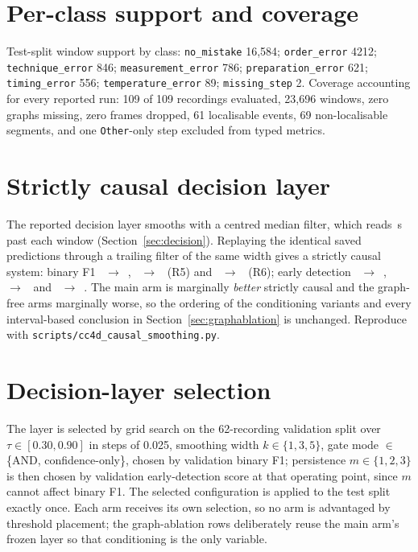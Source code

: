 \documentclass[10pt,twocolumn]{article}
\begin{document}
\section{Per-class support and coverage}
\label{app:coverage}

Test-split window support by class: \texttt{no\_mistake} 16{,}584;
\texttt{order\_error} 4212; \texttt{technique\_error} 846;
\texttt{measurement\_error} 786; \texttt{preparation\_error} 621;
\texttt{timing\_error} 556; \texttt{temperature\_error} 89;
\texttt{missing\_step} 2. Coverage accounting for every reported run: 109 of 109
recordings evaluated, 23{,}696 windows, zero graphs missing, zero frames
dropped, 61 localisable events, 69 non-localisable segments, and one
\texttt{Other}-only step excluded from typed metrics.

\section{Strictly causal decision layer}
\label{app:causal}

The reported decision layer smooths with a centred median filter, which reads
\csLook{}\,s past each window (Section~\ref{sec:decision}). Replaying the
identical saved predictions through a trailing filter of the same width gives a
strictly causal system: binary F1 \resF{}~$\to$~\csF{}, \ngF{}~$\to$~\csNgF{}
(R5) and \ntF{}~$\to$~\csNtF{} (R6); early detection \resEDS{}~$\to$~\csEDS{},
\ngEDS{}~$\to$~\csNgEDS{} and \ntEDS{}~$\to$~\csNtEDS{}. The main arm is
marginally \emph{better} strictly causal and the graph-free arms marginally
worse, so the ordering of the conditioning variants and every interval-based
conclusion in Section~\ref{sec:graphablation} is unchanged. Reproduce with
\texttt{scripts/cc4d\_causal\_smoothing.py}.

\section{Decision-layer selection}
\label{app:decision}

The layer is selected by grid search on the 62-recording validation split over
$\tau \in [0.30, 0.90]$ in steps of 0.025, smoothing width $k \in \{1,3,5\}$,
gate mode $\in$ \{AND, confidence-only\}, chosen by validation binary F1;
persistence $m \in \{1,2,3\}$ is then chosen by validation early-detection score
at that operating point, since $m$ cannot affect binary F1. The selected
configuration is applied to the test split exactly once. Each arm receives its
own selection, so no arm is advantaged by threshold placement; the graph-ablation
rows deliberately reuse the main arm's frozen layer so that conditioning is the
only variable.
\end{document}
